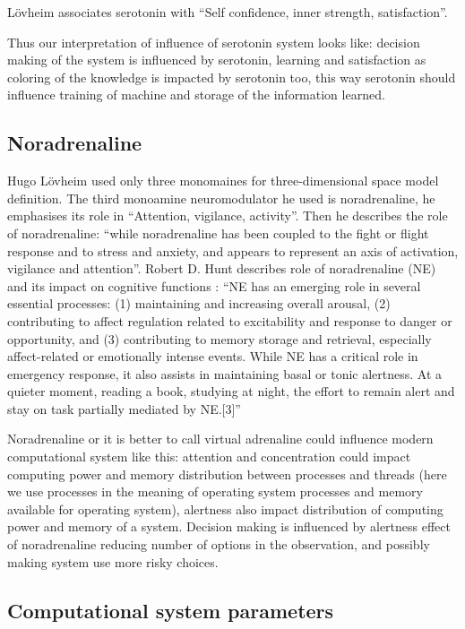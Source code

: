 L\"{o}vheim associates serotonin with ``Self confidence, inner strength, satisfaction''.

Thus our interpretation of influence of serotonin system looks like: decision making of the system is influenced by serotonin, learning and satisfaction as coloring of the knowledge is impacted by serotonin too, this way serotonin should influence training of machine and storage of the information learned.

\subsection{Noradrenaline}

Hugo L\"{o}vheim \cite{cubeofemotions} used only three monomaines for three-dimensional space model definition. The third monoamine neuromodulator he used is noradrenaline, he emphasises its role in ``Attention, vigilance, activity''. Then he describes the role of noradrenaline: ``while noradrenaline has been coupled to the fight or flight response and to stress and anxiety, and appears to represent an axis of activation, vigilance and attention''. Robert D. Hunt describes role of noradrenaline (NE) and its impact on cognitive functions \cite{norepinephrine} : ``NE has an emerging role in several essential processes: (1) maintaining and increasing overall arousal, (2) contributing to affect regulation related to excitability and response to danger or opportunity, and (3) contributing to memory storage and retrieval, especially affect-related or emotionally intense events. While NE has a critical role in emergency response, it also assists in maintaining basal or tonic alertness. At a quieter moment, reading a book, studying at night, the effort to remain alert and stay on task partially mediated by NE.[3]''

Noradrenaline or it is better to call virtual adrenaline could influence modern computational system like this: attention and concentration could impact computing power and memory distribution between processes and threads (here we use processes in the meaning of operating system processes and memory available for operating system), alertness also impact distribution of computing power and memory of a system. Decision making is influenced by alertness effect of noradrenaline reducing number of options in the observation, and possibly making system use more risky choices. 

\subsection{Computational system parameters}

